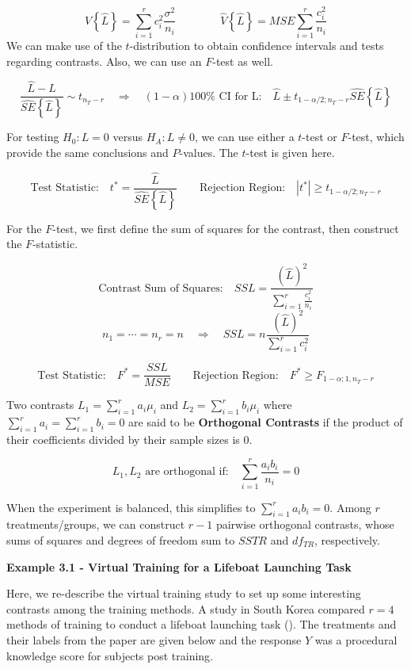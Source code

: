 \documentclass[
]{book}
\begin{document}
\[
V\left\{\hat{L}\right\}=\sum_{i=1}^r c_i^2\frac{\sigma^2}{n_i}
\qquad \qquad
\hat{V}\left\{\hat{L}\right\}=MSE\sum_{i=1}^r\frac{c_i^2}{n_i}
\] We can make use of the \(t\)-distribution to obtain confidence
intervals and tests regarding contrasts. Also, we can use an \(F\)-test
as well.

\[
\frac{\hat{L}-L}{\hat{SE}\left\{\hat{L}\right\}} \sim t_{n_T-r}
\quad \Rightarrow \quad (1-\alpha)100\% \mbox{ CI for L:} \quad
\hat{L} \pm t_{1-\alpha/2;n_T-r}\hat{SE}\left\{\hat{L}\right\}
\]

For testing \(H_0:L=0\) versus \(H_A:L\ne 0\), we can use either a
\(t\)-test or \(F\)-test, which provide the same conclusions and
\(P\)-values. The \(t\)-test is given here.

\[
\mbox{Test Statistic:} \quad t^*=\frac{\hat{L}}{\hat{SE}\left\{\hat{L}\right\}}
\qquad \mbox{Rejection Region:}\quad \left|t^*\right| \ge t_{1-\alpha/2;n_T-r}
\]

For the \(F\)-test, we first define the sum of squares for the contrast,
then construct the \(F\)-statistic.

\[
\mbox{Contrast Sum of Squares:} \quad
SSL = \frac{\left(\hat{L}\right)^2}{\sum_{i=1}^r\frac{c_i^2}{n_i}}
\] \[n_1=\cdots =n_r=n \quad \Rightarrow \quad
SSL=n\frac{\left(\hat{L}\right)^2}{\sum_{i=1}^rc_i^2}
\]

\[
\mbox{Test Statistic:} \quad F^*=\frac{SSL}{MSE} \qquad
\mbox{Rejection Region:} \quad F^* \ge F_{1-\alpha;1,n_T-r}
\]

Two contrasts \(L_1=\sum_{i=1}^ra_i\mu_i\) and
\(L_2=\sum_{i=1}^rb_i\mu_i\) where \(\sum_{i=1}^ra_i=\sum_{i=1}^rb_i=0\)
are said to be \textbf{Orthogonal Contrasts} if the product of their
coefficients divided by their sample sizes is 0.

\[
L_1,L_2\mbox{ are orthogonal if:} \quad \sum_{i=1}^r\frac{a_ib_i}{n_i}=0
\]

When the experiment is balanced, this simplifies to
\(\sum_{i=1}^ra_ib_i=0\). Among \(r\) treatments/groups, we can
construct \(r-1\) pairwise orthogonal contrasts, whose sums of squares
and degrees of freedom sum to \(SSTR\) and \(df_{TR}\), respectively.

\textbf{Example 3.1 - Virtual Training for a Lifeboat Launching Task}

Here, we re-describe the virtual training study to set up some
interesting contrasts among the training methods. A study in South Korea
compared \(r=4\) methods of training to conduct a lifeboat launching
task (). The treatments and
their labels from the paper are given below and the response \(Y\) was a
procedural knowledge score for subjects post training.
\end{document}
